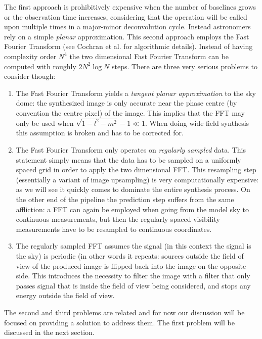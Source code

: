  The first approach is prohibitively expensive when the number of baselines grows or the observation time increases, considering that the operation will be called upon multiple times in a major-minor deconvolution cycle. Instead astronomers rely
 on a simple \emph{planar} approximation. This second approach employs the Fast Fourier Transform (see Cochran et al. \cite{cochran1967fast} for algorithmic details). Instead of having complexity order $N^4$ the two dimensional Fast Fourier 
 Transform can be computed with roughly $2N^2\log{N}$ steps. There are three very serious problems to consider though:
 \begin{enumerate}
  \item The Fast Fourier Transform yields a \emph{tangent planar approximation} to the sky dome: the synthesized image is only accurate near the phase centre (by convention the centre pixel) of the image.
        This implies that the FFT may only be used when $\sqrt{1-l^2-m^2} - 1 \ll 1$. When doing wide field synthesis this assumption is broken and has to be corrected for.
  \item The Fast Fourier Transform only operates on \emph{regularly sampled} data. This statement simply means that the data has to be sampled on a uniformly spaced grid in order to 
	apply the two dimensional FFT. This resampling step (essentially a variant of image upsampling) is very computationally expensive: as we will see it quickly comes to 
	dominate the entire synthesis process. On the other end of the pipeline the prediction step suffers from the same affliction: a FFT can again be employed when going 
	from the model sky to continuous measurements, but then the regularly spaced visibility measurements have to be resampled to continuous coordinates.
  \item The regularly sampled FFT assumes the signal (in this context the signal is the sky) is periodic (in other words it repeats: sources outside the field of view of the produced image is flipped back into the image on the opposite side. This 
	introduces the necessity to filter the image with a filter that only passes signal that is inside the field of view being considered, and stops any energy 
	outside the field of view.
 \end{enumerate}
 The second and third problems are related and for now our discussion will be focused on providing a solution to address them. The first problem will be discussed in
 the next section.
 
